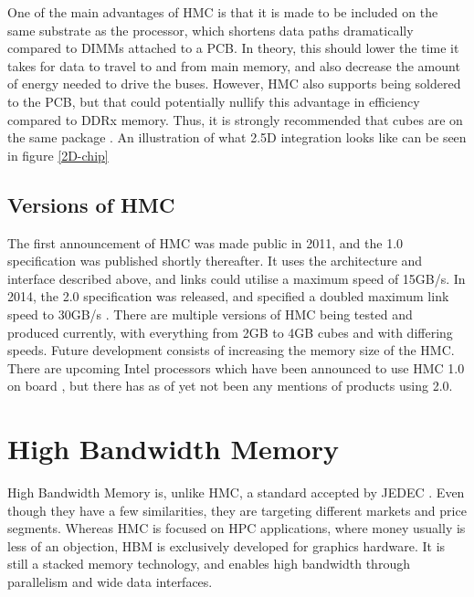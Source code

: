 One of the main advantages of HMC is that it is made to be included on the same substrate as the processor, which shortens data paths dramatically compared to DIMMs attached to a PCB. In theory, this should lower the time it takes for data to travel to and from main memory, and also decrease the amount of energy needed to drive the buses. However, HMC also supports being soldered to the PCB, but that could potentially nullify this advantage in efficiency compared to DDRx memory. Thus, it is strongly recommended that cubes are on the same package \cite{hybrid2013hybrid}. An illustration of what 2.5D integration looks like can be seen in figure \ref{2D-chip}
\bigskip

\subsection{Versions of HMC}
The first announcement of HMC was made public in 2011, and the 1.0 specification was published shortly thereafter. It uses the architecture and interface described above, and links could utilise a maximum speed of 15GB/s. In 2014, the 2.0 specification was released, and specified a doubled maximum link speed to 30GB/s \cite{hybrid2014hybrid}. There are multiple versions of HMC being tested and produced currently, with everything from 2GB to 4GB cubes and with differing speeds. Future development consists of increasing the memory size of the HMC. There are upcoming Intel processors which have been announced to use HMC 1.0 on board \cite{micron2014ikl}, but there has as of yet not been any mentions of products using 2.0. 


\section{High Bandwidth Memory}
High Bandwidth Memory is, unlike HMC, a standard accepted by JEDEC \cite{standard2013high}. Even though they have a few similarities, they are targeting different markets and price segments. Whereas HMC is focused on HPC applications, where money usually is less of an objection, HBM is exclusively developed for graphics hardware. It is still a stacked memory technology, and enables high bandwidth through parallelism and wide data interfaces.

